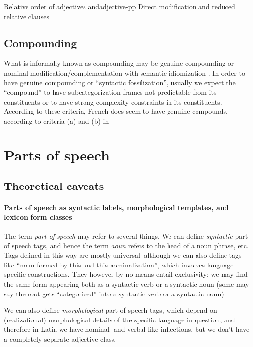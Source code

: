 \documentclass[a4paper, oneside, 12pt]{report}
\newcommand*{\citesec}[1]{\S~{#1}}
\newcommand*{\citechap}[1]{chap.~{#1}}
\newcommand*{\citepage}[1]{p.~{#1}}
\newcommand*{\term}[1]{\emph{#1}}
\begin{document}
\begin{todobox}{Relative order of adjectives and}{adjective-pp}
    Direct modification and reduced relative clauses
\end{todobox}

\subsection{Compounding}\label{sec:grammatical.np.compound}

What is informally known as compounding may be 
genuine compounding or nominal modification/complementation with semantic idiomization
\citep[\citechap{5}, \citesec{14.4}]{cgel}.
In order to have genuine compounding or ``syntactic fossilization'',
usually we expect the ``compound'' to have subcategorization frames
not predictable from its constituents
or to have strong complexity constraints in its constituents.
According to these criteria, French does seem to have genuine compounds,
according to criteria (a) and (b) in \citet[\citepage{15}]{rowlett2007syntax}.

\section{Parts of speech}

\subsection{Theoretical caveats}\label{sec:grammatical.pos.theory}

\paragraph*{Parts of speech as syntactic labels, morphological templates, and lexicon form classes}
The term \term{part of speech} may refer to several things.
We can define \emph{syntactic} part of speech tags,
and hence the term \term{noun} refers to the head of a noun phrase, etc.
Tags defined in this way are mostly universal,
although we can also define tags like ``noun formed by this-and-this nominalization'',
which involves language-specific constructions.
They however by no means entail exclusivity:
we may find the same form appearing both as a syntactic verb or a syntactic noun
(some may say the root gets ``categorized'' into a syntactic verb or a syntactic noun).

We can also define \emph{morphological} part of speech tags,
which depend on (realizational) morphological details of the specific language in question,
and therefore in Latin we have nominal- and verbal-like inflections,
but we don't have a completely separate adjective class.
\end{document}
